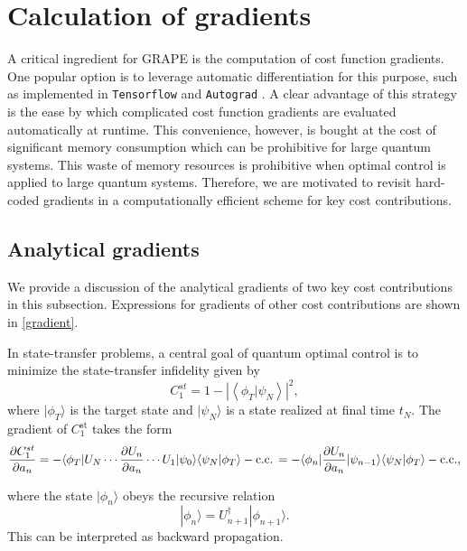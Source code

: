 \documentclass[letterpaper,10pt]{iopart}
\DeclareMathOperator{\cc}{c.c.}
\newcommand{\dket}[1]{|#1\rangle}
\begin{document}
\section{Calculation of gradients}
\label{gradients main text}
A critical ingredient for GRAPE is the computation of cost function gradients. One popular option is to leverage automatic differentiation for this purpose, such as implemented in \texttt{Tensorflow} \cite{tensorflow2015-whitepaper} and \texttt{Autograd} \cite{maclaurin2015autograd}. A clear advantage of this strategy is the ease by which complicated cost function gradients are evaluated automatically at runtime. This convenience, however, is bought at the cost of significant memory consumption which can be prohibitive for large quantum systems. This waste of memory resources is prohibitive when optimal control is applied to large quantum systems.
Therefore, we are motivated to revisit hard-coded gradients in a computationally efficient scheme for key cost contributions.

\subsection{Analytical gradients \label{c1c2}}
We provide a discussion of the analytical gradients of two key cost contributions in this subsection. Expressions for gradients of other cost contributions are shown in \ref{gradient}.

In state-transfer problems, a central goal of quantum optimal control is to minimize the state-transfer infidelity given by 
\begin{equation}
\label{C1st}
    C_1^
{st}=1-\left|\left\langle\phi_T | \psi_{N}\right\rangle\right|^{2},
\end{equation} 
where $\dket{\phi_T}$ is the target state and $\dket{\psi_N}$ is a state realized at final time $t_N$. The gradient of $C_1^{\text{st}}$ takes the form
\begin{equation}
\label{stgradient}
    \frac{\partial C_1^{st} }{\partial a_{ n}}
  =- \langle\phi_T|U_N\cdots \frac {\partial U_{n}}{\partial a_{n}}\cdots U_1|\psi_0\rangle\langle\psi_N|\phi_T\rangle -\cc\\
=-\langle\phi_{n}|\frac {\partial U_n }{\partial a_{n}}|\psi_{n-1}\rangle\langle\psi_N|\phi_T\rangle - \cc ,
\end{equation}
 
where the state $\dket{\phi_{n}}$ obeys the recursive relation
\begin{equation}
    \dket{\phi_{n}}=U_{n+1}^\dagger\dket{\phi_{n+1}}.
\end{equation}
This can be interpreted as backward propagation.
\end{document}
